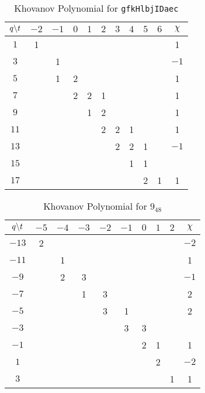 \documentclass{article}
\theoremstyle{plain}
\begin{document}
        \begin{table}
            \centering
            \begin{tabular}{| c | c | c | c | c | c | c | c | c | c | c |}
                \hline
                $q\symbol{92}t$&$-2$&$-1$&$0$&$1$&$2$&$3$&$4$&$5$&$6$&$\chi$\\
                \hline
                $1$&1&&&&&&&&&1\\
                \hline
                $3$&&1&&&&&&&&$-1$\\
                \hline
                $5$&&1&2&&&&&&&1\\
                \hline
                $7$&&&2&2&1&&&&&1\\
                \hline
                $9$&&&&1&2&&&&&1\\
                \hline
                $11$&&&&&2&2&1&&&1\\
                \hline
                $13$&&&&&&2&2&1&&$-1$\\
                \hline
                $15$&&&&&&&1&1&&\\
                \hline
                $17$&&&&&&&&2&1&1\\
                \hline
            \end{tabular}
            \caption{Khovanov Polynomial for \texttt{gfkHlbjIDaec}}
        \end{table}
        \begin{table}
            \centering
            \begin{tabular}{| c | c | c | c | c | c | c | c | c | c |}
                \hline
                $q\symbol{92}t$&$-5$&$-4$&$-3$&$-2$&$-1$&$0$&$1$&$2$&$\chi$\\
                \hline
                $-13$&2&&&&&&&&$-2$\\
                \hline
                $-11$&&1&&&&&&&1\\
                \hline
                $-9$&&2&3&&&&&&$-1$\\
                \hline
                $-7$&&&1&3&&&&&2\\
                \hline
                $-5$&&&&3&1&&&&2\\
                \hline
                $-3$&&&&&3&3&&&\\
                \hline
                $-1$&&&&&&2&1&&1\\
                \hline
                $1$&&&&&&&2&&$-2$\\
                \hline
                $3$&&&&&&&&1&1\\
                \hline
            \end{tabular}
            \caption{Khovanov Polynomial for $9_{48}$}
        \end{table}
\end{document}

